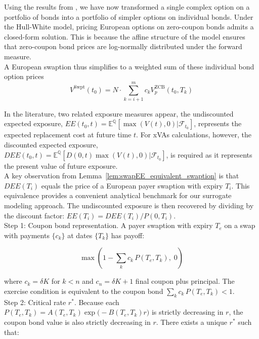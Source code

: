     \noindent
    Using the results from \cite{jamshidian1989exact}, we have now transformed a single complex option on a portfolio of bonds into a portfolio of simpler options on individual bonds. Under the Hull-White model, pricing European options on zero-coupon bonds admits a closed-form solution. This is because the affine structure of the model ensures that zero-coupon bond prices are log-normally distributed under the forward measure.\\   

    \noindent
    A European swaption thus simplifies to a weighted sum of these individual bond option prices
    \begin{equation}
        V^{\text{Swpt}}(t_0) = N \cdot \sum_{k=i+1}^m c_k V_p^{\text{ZCB}}(t_0, T_k)
    \end{equation}
    
    \noindent
     In the literature, two related exposure measures appear, the undiscounted expected exposure, $EE(t_0,t) = \mathbb{E}^{\mathbb{Q}}[\max(V(t),0)|\mathcal{F}_{t_0}]$, represents the expected replacement cost at future time $t$. For xVAs calculations, however, the discounted expected exposure, $DEE(t_0,t) = \mathbb{E}^{\mathbb{Q}}[D(0,t)\max(V(t),0)|\mathcal{F}_{t_0}]$, is required as it represents the present value of future exposure.\\

    \noindent
    A key observation from Lemma~\ref{lem:swapEE_equivalent_swaption} is that $DEE(T_i)$ equals the price of a European payer swaption with expiry $T_i$. This equivalence provides a convenient analytical benchmark for our surrogate modeling approach. The undiscounted exposure is then recovered by dividing by the discount factor: $EE(T_i) = DEE(T_i)/P(0,T_i)$.\\
    
    \noindent
    Step 1: Coupon bond representation. A payer swaption with expiry $T_e$ on a swap with payments $\{c_k\}$ at dates $\{T_k\}$ has payoff:
    
    \begin{equation}
        \max\!\left(1 - \sum_k c_k \, P(T_e, T_k),\; 0\right)
    \end{equation}

    \noindent
    where $c_k = \delta K$ for $k < n$ and $c_n = \delta K + 1$ final coupon plus principal. The exercise condition is equivalent to the coupon bond $\sum_k c_k \, P(T_e, T_k) < 1$. \\

    \noindent
    Step 2: Critical rate $r^*$. Because each $P(T_e, T_k) = A(T_e,T_k) \exp\!\bigl(-B(T_e,T_k) r\bigr)$ is strictly decreasing in $r$, the coupon bond value is also strictly decreasing in $r$. There exists a unique $r^*$ such that:

